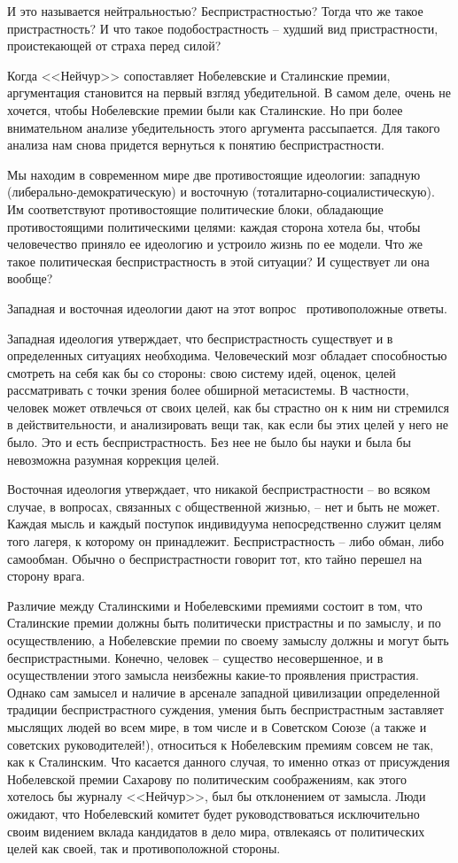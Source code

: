 \documentclass{book}
\begin{document}
И это называется нейтральностью? Беспристрастностью? Тогда что же такое пристрастность? И что такое подобостра­стность --  худший вид пристрастности, проистекающей от стра­ха перед силой?

Когда <<Нейчур>> сопоставляет Нобелевские и Сталинские премии, аргументация становится на первый взгляд убедитель­ной. В самом деле, очень не хочется, чтобы Нобелевские пре­мии были как Сталинские. Но при более внимательном анали­зе убедительность этого аргумента рассыпается. Для такого анализа нам снова придется вернуться к понятию бесприст­растности.

Мы находим в современном мире две противостоящие иде­ологии: западную (либерально-демократическую) и восточ­ную (тоталитарно-социалистическую). Им соответствуют проти­востоящие политические блоки, обладающие противостоящи­ми политическими целями: каждая сторона хотела бы, чтобы человечество приняло ее идеологию и устроило жизнь по ее модели. Что же такое политическая беспристрастность в этой ситуации? И существует ли она вообще?

Западная и восточная идеологии дают на этот вопрос  проти­воположные ответы.

Западная идеология утверждает, что беспристрастность су­ществует и в определенных ситуациях необходима. Человече­ский мозг обладает способностью смотреть на себя как бы со стороны: свою систему идей, оценок, целей рассматривать с точки зрения более обширной метасистемы. В частности, человек может отвлечься от своих целей, как бы страстно он к ним ни стремился в действительности, и анализировать вещи так, как если бы этих целей у него не было. Это и есть беспристрастность. Без нее не было бы науки и была бы невозможна разумная коррекция целей.

Восточная идеология утверждает, что никакой беспристрастности -- во всяком случае, в вопросах, связанных с общественной жизнью, -- нет и быть не может. Каждая мысль и каждый поступок индивидуума непосредственно служит целям того лагеря, к которому он принадлежит. Беспристрастность -- либо обман, либо самообман. Обычно о беспристрастности говорит тот, кто тайно перешел на сторону врага.

Различие между Сталинскими и Нобелевскими премиями состоит в том, что Сталинские премии должны быть политически пристрастны и по замыслу, и по осуществлению, а Нобелевские премии по своему замыслу должны и могут быть беспристрастными. Конечно, человек -- существо несовершенное, и в осуществлении этого замысла неизбежны какие-то проявления пристрастия. Однако сам замысел и наличие в арсенале западной цивилизации определенной традиции беспристрастного суждения, умения быть беспристрастным заставляет мыслящих людей во всем мире, в том числе и в Советском Союзе (а также и советских руководителей!), относиться к Нобелевским премиям совсем не так, как к Сталинским. Что ка­сается данного случая, то именно отказ от присуждения Нобе­левской премии Сахарову по политическим соображениям, как этого хотелось бы журналу <<Нейчур>>, был бы отклонением от замысла. Люди ожидают, что Нобелевский комитет будет руководствоваться исключительно своим видением вклада кандидатов в дело мира, отвлекаясь от политических целей как своей,
 так и противоположной стороны.
\end{document}

